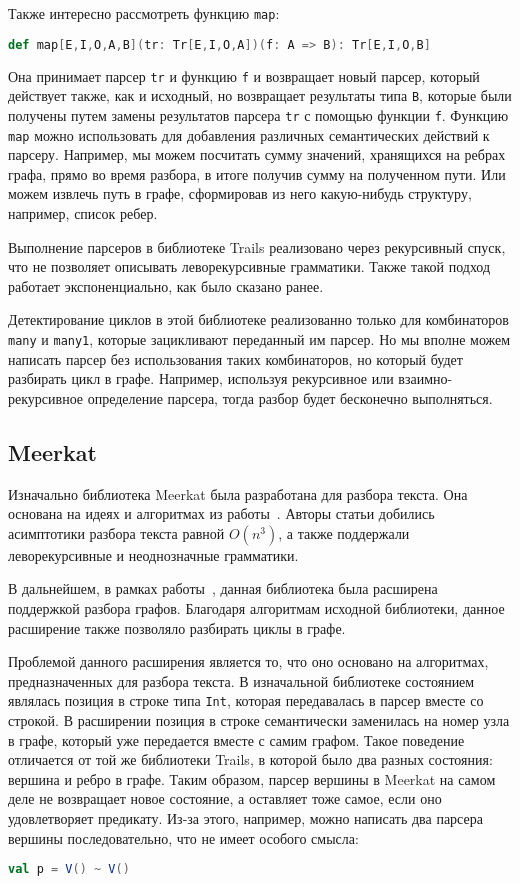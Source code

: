 Также интересно рассмотреть функцию \verb|map|:
\begin{lstlisting}[language=Scala, numbers=none, frame=none]
def map[E,I,O,A,B](tr: Tr[E,I,O,A])(f: A => B): Tr[E,I,O,B]
\end{lstlisting}
Она принимает парсер \verb|tr| и функцию \verb|f| и возвращает новый парсер, который действует также, как и исходный, но возвращает результаты типа \verb|B|, которые были получены путем замены результатов парсера \verb|tr| с помощью функции \verb|f|. 
Функцию \texttt{map} можно использовать для добавления различных семантических действий к парсеру. 
Например, мы можем посчитать сумму значений, хранящихся на ребрах графа, прямо во время разбора, в итоге получив сумму на полученном пути.
Или можем извлечь путь в графе, сформировав из него какую-нибудь структуру, например, список ребер.

Выполнение парсеров в библиотеке Trails реализовано через рекурсивный спуск, что не позволяет описывать леворекурсивные грамматики.
Также такой подход работает экспоненциально, как было сказано ранее.

Детектирование циклов в этой библиотеке реализованно только для комбинаторов \verb|many| и \verb|many1|, которые зацикливают переданный им парсер. 
Но мы вполне можем написать парсер без использования таких комбинаторов, но который будет разбирать цикл в графе.
Например, используя рекурсивное или взаимно-рекурсивное определение парсера, тогда разбор будет бесконечно выполняться.

\subsection{Meerkat}

Изначально библиотека Meerkat была разработана для разбора текста. Она основана на идеях и алгоритмах из работы~\cite{Meerkat}. 
Авторы статьи добились асимптотики разбора текста равной $O(n^3)$, а также поддержали леворекурсивные и неоднозначные грамматики.

В дальнейшем, в рамках работы~\cite{MeerkatGraphs}, данная библиотека была расширена поддержкой разбора графов. Благодаря алгоритмам исходной библиотеки, данное расширение также позволяло разбирать циклы в графе.

Проблемой данного расширения является то, что оно основано на алгоритмах, предназначенных для разбора текста.
В изначальной библиотеке состоянием являлась позиция в строке типа \verb|Int|, которая передавалась в парсер вместе со строкой.
В расширении позиция в строке семантически заменилась на номер узла в графе, который уже передается вместе с самим графом.
Такое поведение отличается от той же библиотеки Trails, в которой было два разных состояния: вершина и ребро в графе.
Таким образом, парсер вершины в Meerkat на самом деле не возвращает новое состояние, а оставляет тоже самое, если оно удовлетворяет предикату.
Из-за этого, например, можно написать два парсера вершины последовательно, что не имеет особого смысла:
\begin{lstlisting}[language=Scala, numbers=none, frame=none]
val p = V() ~ V()
\end{lstlisting}

